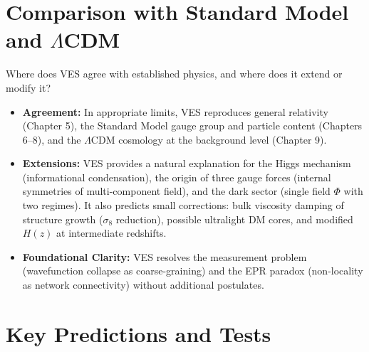 \documentclass[12pt,a4paper]{book}
\begin{document}
\section{Comparison with Standard Model and $\Lambda$CDM}

Where does VES agree with established physics, and where does it extend or modify it?
\begin{itemize}
    \item \textbf{Agreement:} In appropriate limits, VES reproduces general relativity (Chapter 5), the Standard Model gauge group and particle content (Chapters 6–8), and the $\Lambda$CDM cosmology at the background level (Chapter 9).
    \item \textbf{Extensions:} VES provides a natural explanation for the Higgs mechanism (informational condensation), the origin of three gauge forces (internal symmetries of multi-component field), and the dark sector (single field $\Phi$ with two regimes). It also predicts small corrections: bulk viscosity damping of structure growth ($\sigma_8$ reduction), possible ultralight DM cores, and modified $H(z)$ at intermediate redshifts.
    \item \textbf{Foundational Clarity:} VES resolves the measurement problem (wavefunction collapse as coarse-graining) and the EPR paradox (non-locality as network connectivity) without additional postulates.
\end{itemize}

\section{Key Predictions and Tests}
\end{document}
